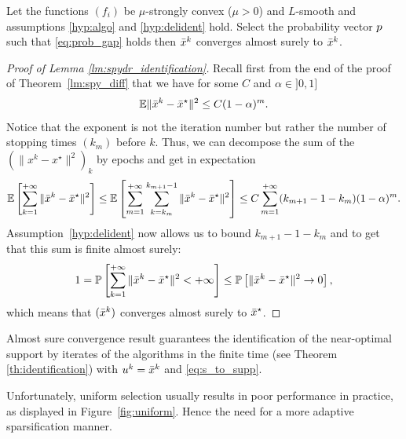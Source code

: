 \begin{lemma}\label{lm:spydr_identification}
Let the functions $(f_i)$ be $\mu$-strongly convex ($\mu>0$) and $L$-smooth and assumptions \ref{hyp:algo} and \ref{hyp:delident} hold. Select the probability vector ${p}$ such that \eqref{eq:prob_gap} holds then $\bar{x}^k$ converges almost surely to $\bar{x}^k$.
\end{lemma}
\begin{proof}[Proof of Lemma \ref{lm:spydr_identification}]
Recall first from the end of the proof of Theorem~\ref{lm:spy_diff} that we have
for some $C$ and $\alpha\in]0,1]$
\begin{equation}\label{eq:recall}
    \mathbb{E}\|\bar{x}^k - \bar{x}^\star\|^2 \leq C (1-\alpha)^m.
\end{equation}
Notice that the exponent is not the iteration number but rather the number of stopping times $(k_m)$ before $k$. Thus, we can decompose the sum of the  
$( \|x^k - x^\star \|^2 )_k$ by epochs and get in expectation 
\begin{align*}
    \mathbb{E}\left[ \sum_{k=1}^{+\infty}  \|\bar{x}^k - \bar{x}^\star \|^2 \right] 
    \leq \mathbb{E}\left[ \sum_{m=1}^{+\infty} \sum_{k=k_m}^{k_{m+1}-1} \|\bar{x}^k -\bar{x}^\star \|^2 \right]
    \leq C \sum_{m=1}^{+\infty} (k_{m+1}-1 - k_m) (1-\alpha)^m.
\end{align*}
Assumption~\ref{hyp:delident} now allows us to bound $k_{m+1}-1 - k_m$ and to get that this sum is finite almost surely:
\[
1 = \mathbb{P}\left[ \sum_{k=1}^{+\infty}  \|\bar{x}^k - \bar{x}^\star \|^2 < +\infty \right] \leq \mathbb{P}\left[ \|\bar{x}^k - \bar{x}^\star \|^2 \to 0 \right],
\]
which means that $(\bar{x}^k)$ converges almost surely to $\bar{x}^\star$.
\end{proof}

Almost sure convergence result guarantees the identification of the near-optimal support by iterates of the algorithms in the finite time (see Theorem \ref{th:identification}) with $u^k = \bar{x}^k$ and \eqref{eq:s_to_supp}. 


Unfortunately, uniform selection usually results in poor performance in practice, as displayed in Figure~\ref{fig:uniform}. Hence the need for a more adaptive sparsification manner.


